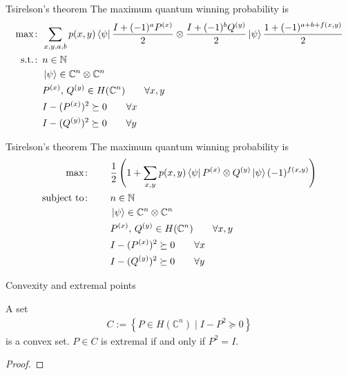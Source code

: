 \documentclass{beamer}
\begin{document}
\begin{frame}{Tsirelson's theorem}
\small
The maximum quantum winning probability is
\begin{align*}
\max\colon\,& \sum_{x,y,a,b}p(x,y) \bra{\psi}\frac{I+(-1)^aP^{(x)}}2\otimes\frac{I+(-1)^b Q^{(y)}}2\ket{\psi}\frac{1+(-1)^{a+b+f(x,y)}}2\\
\text{s.t.}\colon\,&
n\in\mathbb{N}\\
&\ket{\psi} \in \mathbb{C}^n\otimes\mathbb{C}^n\\
&P^{(x)},\, Q^{(y)} \in H(\mathbb{C}^n)\qquad  \forall x,y\\
&I-(P^{(x)})^2\succeq 0\qquad \forall x\\
&I-(Q^{(y)})^2\succeq 0\qquad \forall y\\
\end{align*}
\end{frame}

\begin{frame}{Tsirelson's theorem}
\small
The maximum quantum winning probability is
\begin{align*}
\max\colon\qquad& \frac12\left(1 + \sum_{x,y}p(x,y) \bra{\psi}P^{(x)}\otimes Q^{(y)}\ket{\psi}(-1)^{f(x,y)}\right)\\
\text{subject to}\colon\qquad&
n\in\mathbb{N}\\
&\ket{\psi} \in \mathbb{C}^n\otimes\mathbb{C}^n\\
&P^{(x)},\, Q^{(y)} \in H(\mathbb{C}^n)\qquad  \forall x,y\\
&I-(P^{(x)})^2\succeq 0\qquad \forall x\\
&I-(Q^{(y)})^2\succeq 0\qquad \forall y\\
\end{align*}
\end{frame}

\begin{frame}{Convexity and extremal points}
\begin{lemma}
A set
\begin{align*}
C:=\left\{P\in H(\mathbb{C}^n)\mid I-P^2 \succeq 0\right\}
\end{align*}
is a convex set. $P\in C$ is extremal if and only if $P^2=I$.
\end{lemma}
\begin{proof}
\end{proof}
\end{frame}
\end{document}
